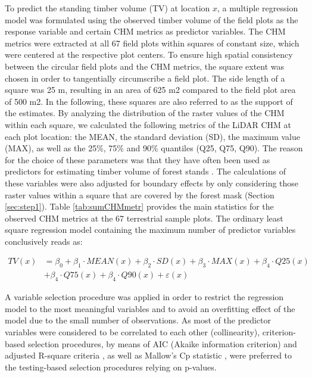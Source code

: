 To predict the standing timber volume (TV) at location $x$, a multiple regression model was formulated using the observed timber volume of the field plots as the response variable and certain CHM metrics as predictor variables. The CHM metrics were extracted at all 67 field plots within squares of constant size, which were centered at the respective plot centers. To ensure high spatial consistency between the circular field plots and the CHM metrics, the square extent was chosen in order to tangentially circumscribe a field plot. The side length of a square was 25 m, resulting in an area of 625 m2 compared to the field plot area of 500 m2. In the following, these squares are also referred to as the support of the estimates. By analyzing the distribution of the raster values of the CHM within each square, we calculated the following metrics of the LiDAR CHM at each plot location: the MEAN, the standard deviation (SD), the maximum value (MAX), as well as the 25\%, 75\% and 90\% quantiles (Q25, Q75, Q90). The reason for the choice of these parameters was that they have often been used as predictors for estimating timber volume of forest stands \citep{holmgren2004, naesset2002, lefsky1999, magnussen1999}. The calculations of these variables were also adjusted for boundary effects by only considering those raster values within a square that are covered by the forest mask (Section \ref{sec:step1}). Table \ref{tab:sumCHMmetr} provides the main statistics for the observed CHM metrics at the 67 terrestrial sample plots. The ordinary least square regression model containing the maximum number of predictor variables conclusively reads as:

\begin{equation}\label{eq:regmod}
\begin{aligned}
TV(x) & = \beta_0 + \beta_{1} \cdot MEAN(x) + \beta_{2} \cdot SD(x) + \beta_{3} \cdot MAX(x) + \beta_{4} \cdot Q25(x) \\ 
& + \beta_{4} \cdot Q75(x) + \beta_{4} \cdot Q90(x) + \varepsilon(x)
\end{aligned}
\end{equation}

A variable selection procedure was applied in order to restrict the regression model to the most meaningful variables and to avoid an overfitting effect of the model \citep{draper2014} due to the small number of observations. As most of the predictor variables were considered to be correlated to each other (collinearity), criterion-based selection procedures, by means of AIC (Akaike information criterion) \citep{akaike1992} and adjusted R-square criteria \citep{srivastava1995}, as well as Mallow's Cp statistic \citep{mallows2000}, were preferred to the testing-based selection procedures relying on p-values.

